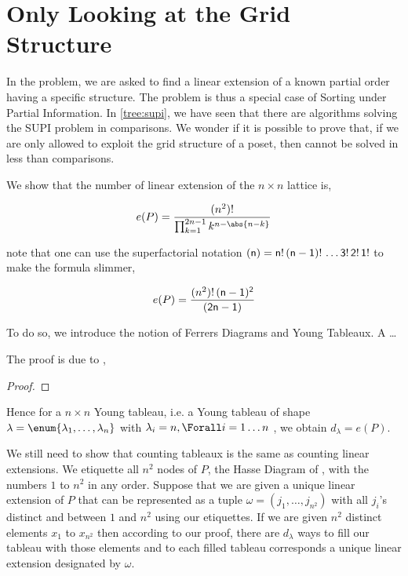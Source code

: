 \section{Only Looking at the Grid Structure}
\label{tree:xy:grid}

In the \XY problem, we are asked to find a linear extension of a known partial
order having a specific structure. The \XY problem is thus a special case of
Sorting under Partial Information. In \ref{tree:supi}, we have seen that there
are algorithms solving the SUPI problem in  comparisons. We
wonder if it is possible to prove that, if we are only allowed to exploit the
grid structure of a \XY poset, then \XY cannot be solved in less than  comparisons.

We show that the number of linear extension of the \( n \times n \) lattice is,

\begin{displaymath}
e(P) = \frac{(n^2)!}{\prod_{k=1}^{2n-1} k^{n - \abs{n-k}}}
\end{displaymath}

note that one can use the superfactorial notation
\( \sf(n) = n!\,(n-1)!\,\ldots 3!\,2!\,1! \)
to make the formula slimmer,

\begin{displaymath}
e(P) = \frac{(n^2)! \, \sf(n-1)^2}{\sf(2n-1)}
\end{displaymath}

To do so, we introduce the notion of Ferrers Diagrams and Young Tableaux. A
\dots

The proof is due to \citet*{greene:1979},

\begin{proof}

\end{proof}

Hence for a \( n \times n \) Young tableau, i.e. a Young tableau of shape
\( \lambda = \enum{ \lambda_1 , \ldots , \lambda_n } \)
with
\( \lambda_i = n, \Forall i = 1 \ldots n \)
, we obtain
\( d_{\lambda} = e(P) \).

We still need to show that counting tableaux is the same as counting linear
extensions. We etiquette all \( n^2 \) nodes of \(P\), the Hasse Diagram of
\XY, with the numbers \(1\) to \( n^2 \) in any order. Suppose that we are
given a unique linear extension of \(P\) that can be represented as a tuple
\( \omega = ( j_1 , \ldots , j_{n^2}) \)
with all \( j_i \)'s distinct and between \(1\) and \( n^2 \) using our
etiquettes. If we are given \( n^2 \) distinct elements \( x_1 \) to
\( x_{n^2} \) then according to our proof, there are \( d_{\lambda} \) ways to
fill our tableau with those elements and to each filled tableau corresponds a
unique linear extension designated by \(\omega\).

